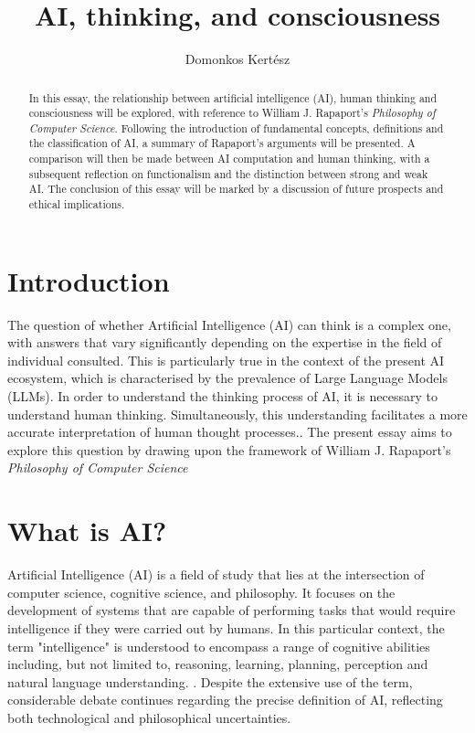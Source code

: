 \documentclass[runningheads]{llncs}
\begin{document}
%
%
\title{AI, thinking, and consciousness}
\author{Domonkos Kertész\\
}
%
%
\maketitle
%
%
%
%
%
\begin{abstract}
In this essay, the relationship between artificial intelligence (AI), human thinking and consciousness will be explored, with reference to William J. Rapaport's \textit{Philosophy of Computer Science}. Following the introduction of fundamental concepts, definitions and the classification of AI, a summary of Rapaport's arguments will be presented. A comparison will then be made between AI computation and human thinking, with a subsequent reflection on functionalism and the distinction between strong and weak AI. The conclusion of this essay will be marked by a discussion of future prospects and ethical implications.
\end{abstract}
%
%
%
%
%
\section{Introduction}
%
The question of whether Artificial Intelligence (AI) can think is a complex one, with answers that vary significantly depending on the expertise in the field of individual consulted. This is particularly true in the context of the present AI ecosystem, which is characterised by the prevalence of Large Language Models (LLMs). In order to understand the thinking process of AI, it is necessary to understand human thinking. Simultaneously, this understanding facilitates a more accurate interpretation of human thought processes.\cite{rapaport2005philosophy}. The present essay aims to explore this question by drawing upon the framework of William J. Rapaport's \textit{Philosophy of Computer Science}
%
%
\section{What is AI?}
%
Artificial Intelligence (AI) is a field of study that lies at the intersection of computer science, cognitive science, and philosophy. It focuses on the development of systems that are capable of performing tasks that would require intelligence if they were carried out by humans. In this particular context, the term "intelligence" is understood to encompass a range of cognitive abilities including, but not limited to, reasoning, learning, planning, perception and natural language understanding. \cite{russell2010artificial}. Despite the extensive use of the term, considerable debate continues regarding the precise definition of AI, reflecting both technological and philosophical uncertainties.
%
%
\end{document}
